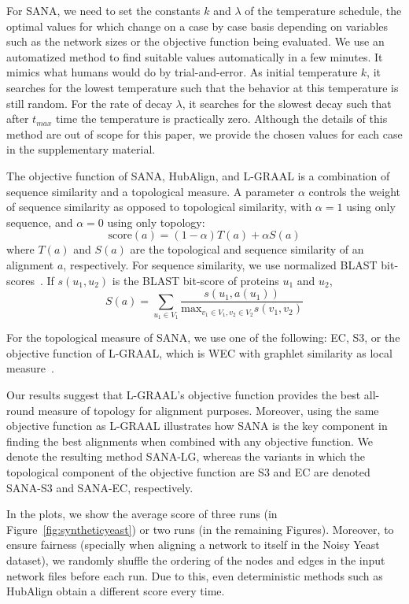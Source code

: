 \documentclass{bioinfo}
\begin{document}
For SANA, we need to set the constants $k$ and $\lambda$ of the temperature schedule, the optimal values for which change on a case by case basis depending on variables such as the network sizes or the objective function being evaluated. We use an automatized method to find suitable values automatically in a few minutes. It mimics what humans would do by trial-and-error. As initial temperature $k$, it searches for the lowest temperature such that the behavior at this temperature is still random. For the rate of decay $\lambda$, it searches for the slowest decay such that after $t_{max}$ time the temperature is practically zero. Although the details of this method are out of scope for this paper, we provide the chosen values for each case in the supplementary material.

The objective function of SANA, HubAlign, and L-GRAAL is a combination of sequence similarity and a topological measure. A parameter $\alpha$ controls the weight of sequence similarity as opposed to topological similarity, with $\alpha=1$ using only sequence, and $\alpha=0$ using only topology:
\begin{equation}
\mbox{score}(a) = (1-\alpha)T(a) + \alpha S(a)\label{eq:alpha}
\end{equation}
where $T(a)$ and $S(a)$ are the topological and sequence similarity of an alignment $a$, respectively. For sequence similarity, we use normalized BLAST bit-scores~\citep{blast}. If $s(u_1,u_2)$ is the BLAST bit-score of proteins $u_1$ and $u_2$,
$$S(a)=\sum_{u_1\in V_1} \frac{s(u_1,a(u_1))}{\mbox{max}_{v_1\in V_1,v_2\in V_2}s(v_1,v_2)}$$

For the topological measure of SANA, we use one of the following: EC, S3, or the objective function of L-GRAAL, which is WEC with graphlet similarity as local measure~\citep{LGRAAL}.

Our results suggest that L-GRAAL's objective function provides the best all-round measure of topology for alignment purposes. Moreover, using the same objective function as L-GRAAL illustrates how SANA is the key component in finding the best alignments when combined with any objective function. We denote the resulting method SANA-LG, whereas the variants in which the topological component of the objective function are S3 and EC are denoted SANA-S3 and SANA-EC, respectively.

In the plots, we show the average score of three runs (in Figure~\ref{fig:syntheticyeast}) or two runs (in the remaining Figures). Moreover, to ensure fairness (specially when aligning a network to itself in the Noisy Yeast dataset), we randomly shuffle the ordering of the nodes and edges in the input network files before each run. Due to this, even deterministic methods such as HubAlign obtain a different score every time.
\end{document}
